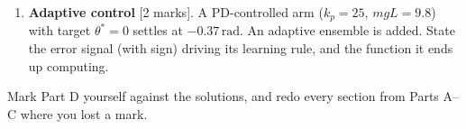 \documentclass[11pt,letterpaper]{article}
\newcommand{\T}{\mathsf{T}}
\begin{document}
\begin{enumerate}
\begin{enumerate}[label=(\alph*)]
\item {}[2] Compute $\gamma = \mathbf A^\T\mathbf A$, its singular values and vectors, and $\chi = \mathbf A\mathbf U$. Describe each $\chi_m$.
\item {}[2] With noise $\sigma^2 = 4$, which of the two basis functions is at the edge of usability? What is the decoded $\hat x$ at $x = 1$? State the general rule linking $S_m$, $\sigma^2$ and usability.
\end{enumerate}
\item \textbf{Adaptive control} [2 marks]. A PD-controlled arm ($k_p = 25$, $mgL = 9.8$) with target $\theta^* = 0$ settles at $-0.37\,\mathrm{rad}$. An adaptive ensemble is added. State the error signal (with sign) driving its learning rule, and the function it ends up computing.
\end{enumerate}

\vspace{8pt}
Mark Part D yourself against the solutions, and redo every section from Parts A--C where you lost a mark.
\end{document}
